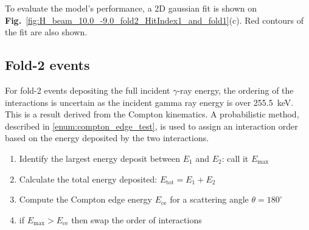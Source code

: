 To evaluate the model's performance, a 2D gaussian fit is shown on \textbf{Fig.}~\ref{fig:H_beam_10.0_-9.0_fold2_HitIndex1_and_fold1}(c). Red contours of the fit are also shown.


\subsection{Fold-2 events}
For fold-2 events depositing the full incident $\gamma$-ray energy, the ordering of the interactions is uncertain as the incident gamma ray energy is over 255.5~keV. This is a result derived from the Compton kinematics. A probabilistic method, described in \ref{enum:compton_edge_test}, is used to assign an interaction order based on the energy deposited by the two interactions.
\begin{enumerate}
    \label{enum:compton_edge_test}
    \item Identify the largest energy deposit between $E_1$ and $E_2$: call it $E_\text{max}$
    \item Calculate the total energy deposited: $E_\text{tot} = E_1 + E_2$\;
    \item Compute the Compton edge energy $E_\text{ce}$ for a scattering angle $\theta = 180^\circ$\;
    \item if $E_\text{max} > E_\text{ce}$ then swap the order of interactions
\end{enumerate}


